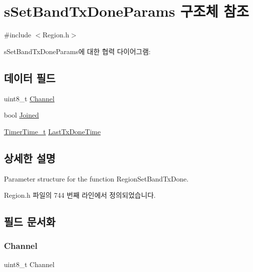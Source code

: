 \hypertarget{structs_set_band_tx_done_params}{}\section{s\+Set\+Band\+Tx\+Done\+Params 구조체 참조}
\label{structs_set_band_tx_done_params}


{\ttfamily \#include $<$Region.\+h$>$}



s\+Set\+Band\+Tx\+Done\+Params에 대한 협력 다이어그램\+:
\subsection*{데이터 필드}
\begin{DoxyCompactItemize}
\item 
uint8\+\_\+t \mbox{\hyperlink{structs_set_band_tx_done_params_a1ca6f01ca18afe402de51babe8c95f5e}{Channel}}
\item 
bool \mbox{\hyperlink{structs_set_band_tx_done_params_ac2f6caa0f3b02d2ac5056c3ee7c22652}{Joined}}
\item 
\mbox{\hyperlink{utilities_8h_a4215ca43d3e953099ea758ce428599d0}{Timer\+Time\+\_\+t}} \mbox{\hyperlink{structs_set_band_tx_done_params_a7316dfb002c4e0015fceeb727020fe5c}{Last\+Tx\+Done\+Time}}
\end{DoxyCompactItemize}


\subsection{상세한 설명}
Parameter structure for the function Region\+Set\+Band\+Tx\+Done. 

Region.\+h 파일의 744 번째 라인에서 정의되었습니다.



\subsection{필드 문서화}
\mbox{\label{structs_set_band_tx_done_params_a1ca6f01ca18afe402de51babe8c95f5e}} 
\subsubsection{\texorpdfstring{Channel}{Channel}}
{\footnotesize\ttfamily uint8\+\_\+t Channel}

